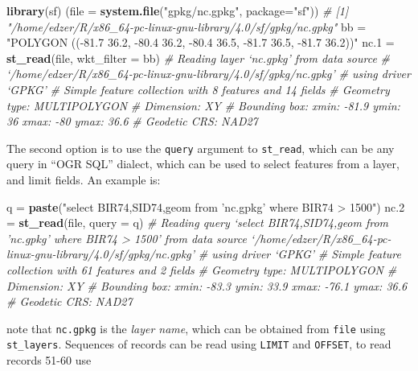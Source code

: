 \documentclass[]{book}
\newenvironment{Shaded}{\begin{snugshade}}{\end{snugshade}}
\newcommand{\CommentTok}[1]{\textcolor[rgb]{0.56,0.35,0.01}{\textit{#1}}}
\newcommand{\DataTypeTok}[1]{\textcolor[rgb]{0.13,0.29,0.53}{#1}}
\newcommand{\FloatTok}[1]{\textcolor[rgb]{0.00,0.00,0.81}{#1}}
\newcommand{\KeywordTok}[1]{\textcolor[rgb]{0.13,0.29,0.53}{\textbf{#1}}}
\newcommand{\NormalTok}[1]{#1}
\newcommand{\StringTok}[1]{\textcolor[rgb]{0.31,0.60,0.02}{#1}}
\begin{document}
\begin{Shaded}
\begin{Highlighting}[]
\KeywordTok{library}\NormalTok{(sf)}
\NormalTok{(}\DataTypeTok{file =} \KeywordTok{system.file}\NormalTok{(}\StringTok{"gpkg/nc.gpkg"}\NormalTok{, }\DataTypeTok{package=}\StringTok{"sf"}\NormalTok{))}
\CommentTok{# [1] "/home/edzer/R/x86_64-pc-linux-gnu-library/4.0/sf/gpkg/nc.gpkg"}
\NormalTok{bb =}\StringTok{ "POLYGON ((-81.7 36.2, -80.4 36.2, -80.4 36.5, -81.7 36.5, -81.7 36.2))"}
\NormalTok{nc}\FloatTok{.1}\NormalTok{ =}\StringTok{ }\KeywordTok{st_read}\NormalTok{(file, }\DataTypeTok{wkt_filter =}\NormalTok{ bb)}
\CommentTok{# Reading layer `nc.gpkg' from data source }
\CommentTok{#   `/home/edzer/R/x86_64-pc-linux-gnu-library/4.0/sf/gpkg/nc.gpkg' }
\CommentTok{#   using driver `GPKG'}
\CommentTok{# Simple feature collection with 8 features and 14 fields}
\CommentTok{# Geometry type: MULTIPOLYGON}
\CommentTok{# Dimension:     XY}
\CommentTok{# Bounding box:  xmin: -81.9 ymin: 36 xmax: -80 ymax: 36.6}
\CommentTok{# Geodetic CRS:  NAD27}
\end{Highlighting}
\end{Shaded}

The second option is to use the \texttt{query} argument to \texttt{st\_read},
which can be any query in ``OGR SQL'' dialect, which can be used to
select features from a layer, and limit fields. An example is:

\begin{Shaded}
\begin{Highlighting}[]
\NormalTok{q =}\StringTok{ }\KeywordTok{paste}\NormalTok{(}\StringTok{"select BIR74,SID74,geom from 'nc.gpkg' where BIR74 > 1500"}\NormalTok{)}
\NormalTok{nc}\FloatTok{.2}\NormalTok{ =}\StringTok{ }\KeywordTok{st_read}\NormalTok{(file, }\DataTypeTok{query =}\NormalTok{ q)}
\CommentTok{# Reading query `select BIR74,SID74,geom from 'nc.gpkg' where BIR74 > 1500' from data source `/home/edzer/R/x86_64-pc-linux-gnu-library/4.0/sf/gpkg/nc.gpkg' }
\CommentTok{#   using driver `GPKG'}
\CommentTok{# Simple feature collection with 61 features and 2 fields}
\CommentTok{# Geometry type: MULTIPOLYGON}
\CommentTok{# Dimension:     XY}
\CommentTok{# Bounding box:  xmin: -83.3 ymin: 33.9 xmax: -76.1 ymax: 36.6}
\CommentTok{# Geodetic CRS:  NAD27}
\end{Highlighting}
\end{Shaded}

note that \texttt{nc.gpkg} is the \emph{layer name}, which can be obtained from \texttt{file} using \texttt{st\_layers}.
Sequences of records can be read using \texttt{LIMIT} and \texttt{OFFSET}, to read records 51-60 use
\end{document}
